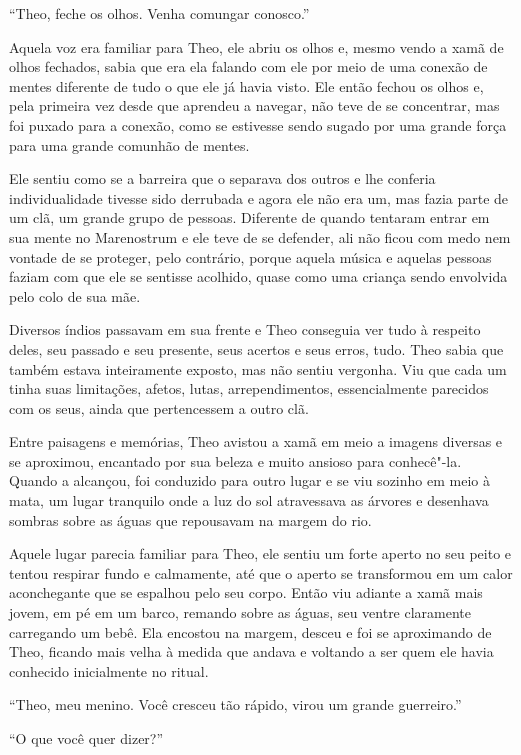 ``Theo, feche os olhos. Venha comungar conosco.''

Aquela voz era familiar para Theo, ele abriu os olhos e, mesmo vendo a
xamã de olhos fechados, sabia que era ela falando com ele por meio de
uma conexão de mentes diferente de tudo o que ele já havia visto. Ele
então fechou os olhos e, pela primeira vez desde que aprendeu a navegar,
não teve de se concentrar, mas foi puxado para a conexão, como se
estivesse sendo sugado por uma grande força para uma grande comunhão de
mentes.

Ele sentiu como se a barreira que o separava dos outros e lhe conferia
individualidade tivesse sido derrubada e agora ele não era um, mas fazia
parte de um clã, um grande grupo de pessoas. Diferente de quando
tentaram entrar em sua mente no Marenostrum e ele teve de se defender,
ali não ficou com medo nem vontade de se proteger, pelo contrário,
porque aquela música e aquelas pessoas faziam com que ele se sentisse
acolhido, quase como uma criança sendo envolvida pelo colo de sua mãe.

Diversos índios passavam em sua frente e Theo conseguia ver tudo à
respeito deles, seu passado e seu presente, seus acertos e seus erros,
tudo. Theo sabia que também estava inteiramente exposto, mas não sentiu
vergonha. Viu que cada um tinha suas limitações, afetos, lutas,
arrependimentos, essencialmente parecidos com os seus, ainda que
pertencessem a outro clã.

Entre paisagens e memórias, Theo avistou a xamã em meio a imagens
diversas e se aproximou, encantado por sua beleza e muito ansioso para
conhecê"-la. Quando a alcançou, foi conduzido para outro lugar e se viu
sozinho em meio à mata, um lugar tranquilo onde a luz do sol atravessava
as árvores e desenhava sombras sobre as águas que repousavam na margem
do rio.

Aquele lugar parecia familiar para Theo, ele sentiu um forte aperto no
seu peito e tentou respirar fundo e calmamente, até que o aperto se
transformou em um calor aconchegante que se espalhou pelo seu corpo.
Então viu adiante a xamã mais jovem, em pé em um barco, remando sobre as
águas, seu ventre claramente carregando um bebê. Ela encostou na margem,
desceu e foi se aproximando de Theo, ficando mais velha à medida que
andava e voltando a ser quem ele havia conhecido inicialmente no ritual.

``Theo, meu menino. Você cresceu tão rápido, virou um grande
guerreiro.''

``O que você quer dizer?''

